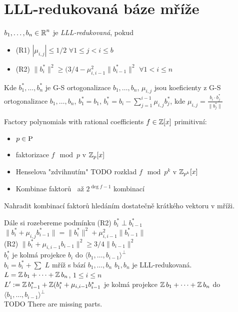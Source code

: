 \section{LLL-redukovaná báze mříže}

\begin{definition}
$b_1,\ldots,b_n\in\operatorname{\mathbb{R}}^n$ je \emph{LLL-redukovaná}, pokud
\begin{itemize}
    \item (R1) $|\mu_{i,j}|\leq 1/2$ $\forall 1\leq j<i\leq b$
    \item (R2) $\|b_i^*\|^2\geq(3/4-\mu_{i,i-1}^2\|b_{i-1}^*\|^2$ $\forall 1<i\leq n$
\end{itemize}
Kde $b_1^*,\ldots,b_n^*$ je G-S ortogonalizace $b_1,\ldots,b_n$, $\mu_{i,j}$ jsou koeficienty z G-S ortogonalizace $b_1,\ldots,b_n$, $b_1^*=b_1$, $b_i^*=b_i-\sum_{j=1}^{i-1}\mu_{i,j}b_j^*$, kde 
$\mu_{i,j}=\frac{b_i\cdot b_j^*}{\|b_j^*\|}$
\end{definition}

\begin{note}
Factory polynomials with rational coefficients $f\in\operatorname{\mathbb{Z}} [x]$ primitivní:
\begin{itemize}
    \item $p\in \operatorname{P}$
    \item faktorizace $f\!\mod p$ v $\operatorname{\mathbb{Z}}_p[x]$
    \item Henselova "zdvihnutím" TODO rozklad $f\!\mod p^k$ v $\operatorname{\mathbb{Z}}_{p^k}[x]$
    \item Kombinae faktorů $~$ až $2^{\deg f -1}$ kombinací
\end{itemize}
Nahradit kombinací faktorů hledáním dostatečně krátkého vektoru v mříži.
\end{note}
\begin{note}
Dále si rozebereme podmínku (R2)\newline
$b_i^*\perp b_{i-1}^*$\\
$\|b_i^*+\mu_{i,j}b_{i-1}^*\|=\|b_i^*\|^2+\mu_{i,i-1}^2\|b_{i-1}^*\|$\\
(R2) $\|b_i^*+\mu_{i,i-1}b_{i-1}\|^2\geq 3/4 \|b_{i-1}\|^2$\\

$b_i^*$ je kolmá projekce $b_i$ do $\langle b_1,\ldots, b_{i-1}\rangle^\perp$\\
$b_i=b_i^*+\sum$
$L$ mříž s bází $b_1,\ldots,b_n$ $b_1,b_n$ je LLL-redukovaná.\\
$L=\operatorname{\mathbb{Z}} b_1+\cdots +\operatorname{\mathbb{Z}} b_n$, $1\leq i\leq n$\\
$L':=\operatorname{\mathbb{Z}} b_{i-1}^* + \operatorname{\mathbb{Z}}(b_i^*+\mu_{i,i-1}b_{i-1}^*$ je kolmá projekce $\operatorname{\mathbb{Z}} b_1+ \cdots + \operatorname{\mathbb{Z}} b_n$ do $\langle b_1,\ldots, b_{i-1}\rangle^\perp$\\

TODO There are missing parts.
\end{note}

